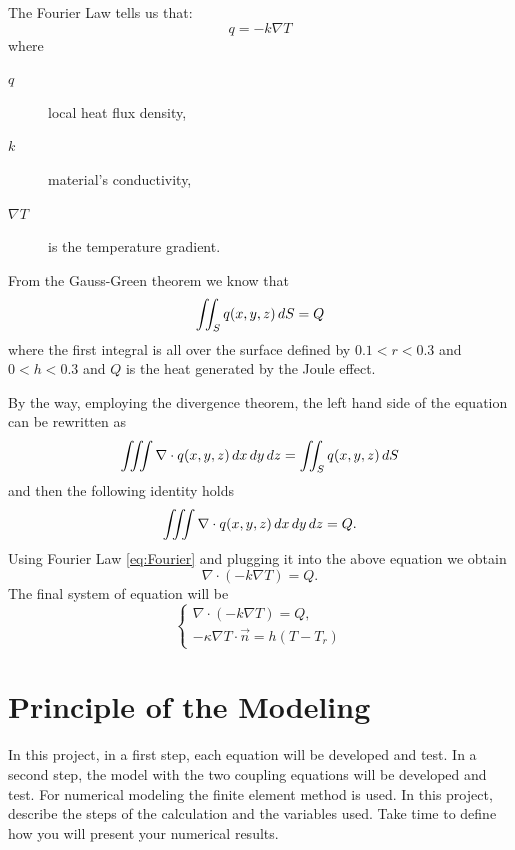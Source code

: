 \begin{mdframed}
	The Fourier Law tells us that:
	\begin{equation}
	\label{eq:Fourier}
	q=-k\nabla T
	\end{equation}
	where
	\begin{description}
		\item[$ q$] local heat flux density,
		\item[$ k $] material's conductivity,
		\item[$ \nabla T $] is the temperature gradient. 
	\end{description}
	From the Gauss-Green theorem we know that 
	\[
	\iint_S q(x,y,z) \mathop{}\!d S=Q
	\]
	where the first integral is all over the surface defined by $ 0.1<r<0.3 $ and $ 0<h<0.3 $ and $ Q $ is the heat generated by the Joule effect.
	
	By the way, employing the divergence theorem, the left hand side of the equation can be rewritten as  
	\[ \iiint \nabla\cdot q(x,y,z) \mathop{}\!d x\mathop{}\!d y\mathop{}\!d z = \iint_S q(x,y,z) \mathop{}\!d S  \]
	and then the following identity holds
	\begin{equation}
	\iiint \nabla\cdot q(x,y,z) \mathop{}\!d x\mathop{}\!d y\mathop{}\!d z = Q.
	\end{equation}
	Using Fourier Law \eqref{eq:Fourier} and plugging it into the above equation we obtain
	\begin{equation}
	\nabla\cdot(-k\nabla T)=Q.
	\end{equation}
	The final system of equation will be
	\begin{equation}
	\label{problem:heat}
	\begin{cases}
		\nabla\cdot(-k\nabla T)=Q, \\
		-\kappa\nabla T\cdot \vec{n}=h(T-T_r)
	\end{cases}
	\end{equation}
\end{mdframed}

	
\section{Principle of the Modeling}
In this project, in a first step, each equation will be developed and test. In a second step, the model with the
two coupling equations will be developed and test. For numerical modeling the finite element method is
used. In this project, describe the steps of the calculation and the variables used. Take time to define how you
will present your numerical results.
